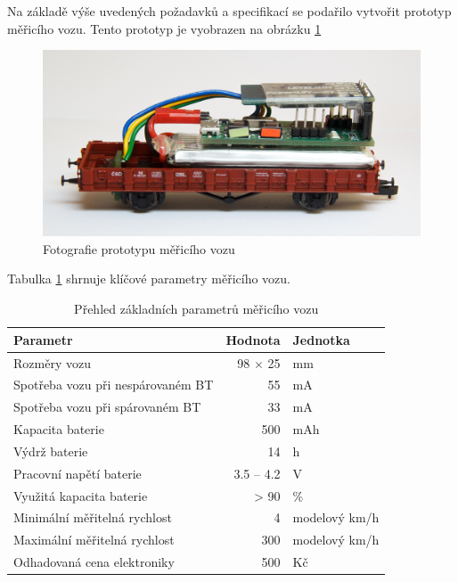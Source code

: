 Na základě výše uvedených požadavků a specifikací se podařilo vytvořit prototyp
měřicího vozu. Tento prototyp je vyobrazen na obrázku \ref{fig:vuz-photo}

\begin{figure}[h]
\includegraphics[width=\textwidth]{data/wsm_3d.jpg}
\caption{Fotografie prototypu měřicího vozu}
\label{fig:vuz-photo}
\end{figure}

Tabulka \ref{tab:wsm-params} shrnuje klíčové parametry měřicího vozu.

\begin{table}
	\begin{tabularx}{\textwidth}{lrl}
		\toprule
		Parametr & Hodnota & Jednotka \\
		\midrule
		Rozměry vozu\footnote & 98 $\times$ 25 & mm \\
		Spotřeba vozu při nespárovaném BT & 55 & mA \\
		Spotřeba vozu při spárovaném BT & 33 & mA \\
		Kapacita baterie & 500 & mAh \\
		Výdrž baterie & 14 & h \\
		Pracovní napětí baterie & 3.5 -- 4.2 & V \\
		Využitá kapacita baterie & > 90 & \% \\
		Minimální měřitelná rychlost & 4 & modelový km/h\\
		Maximální měřitelná rychlost\footnote & 300 & modelový
		km/h\\
		Odhadovaná cena elektroniky & 500 & Kč\\
		\bottomrule
	\end{tabularx}
	\caption{Přehled základních parametrů měřicího vozu}
	\label{tab:wsm-params}
\end{table}

